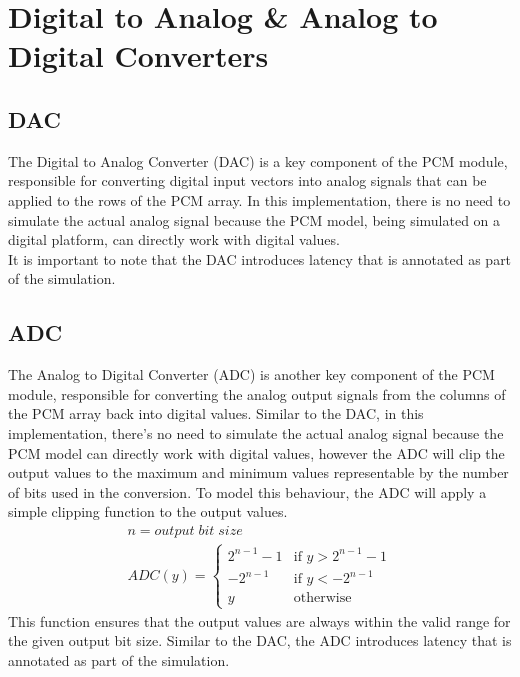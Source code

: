\section{Digital to Analog \& Analog to Digital Converters}\label{sec:mod_gvsoc}
\subsection{DAC}\label{sec:dac}
The Digital to Analog Converter (DAC) is a key component of the PCM module, 
responsible for converting digital input vectors into analog signals that can be applied to the rows of the PCM array.
In this implementation, there is no need to simulate the actual analog signal because the PCM model, being simulated on a digital platform, can directly work with digital values.\\
It is important to note that the DAC introduces latency that is annotated as part of the simulation.
\subsection{ADC}\label{sec:adc}
The Analog to Digital Converter (ADC) is another key component of the PCM module,
responsible for converting the analog output signals from the columns of the PCM array back into digital values.
Similar to the DAC, in this implementation, there's no need to simulate the actual analog signal because the PCM model can directly work with digital values,
 however the ADC will clip the output values to the maximum and minimum values representable by the number of bits used in the conversion.
To model this behaviour, the ADC will apply a simple clipping function to the output values.
\begin{align}     
    n=output\;bit\;size\\
    ADC(y) = 
    \begin{cases}
    2^{n-1}-1 & \text{if } y > 2^{n-1}-1 \\
    -2^{n-1} & \text{if } y < -2^{n-1} \\
    y & \text{otherwise}
    \end{cases}
\end{align}
This function ensures that the output values are always within the valid range for the given output bit size.
Similar to the DAC, the ADC introduces latency that is annotated as part of the simulation.
